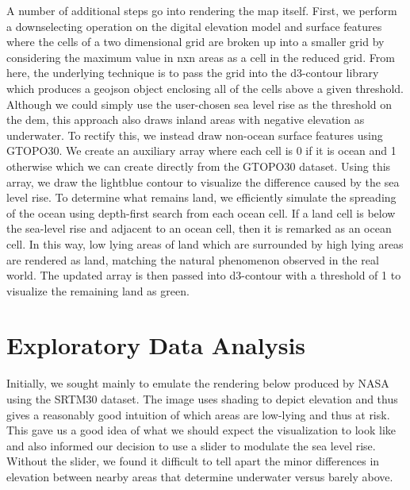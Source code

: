 \documentclass[12pt]{article}
\begin{document}
		A number of additional steps go into rendering the map itself.
		First, we perform a downselecting operation on the digital elevation model and surface features where the cells of a two dimensional grid are broken up into a smaller grid by considering the maximum value in nxn areas as a cell in the reduced grid.
		From here, the underlying technique is to pass the grid into the d3-contour library which produces a geojson object enclosing all of the cells above a given threshold.
		Although we could simply use the user-chosen sea level rise as the threshold on the dem, this approach also draws inland areas with negative elevation as underwater.
		To rectify this, we instead draw non-ocean surface features using GTOPO30.
		We create an auxiliary array where each cell is 0 if it is ocean and 1 otherwise which we can create directly from the GTOPO30 dataset.
		Using this array, we draw the lightblue contour to visualize the difference caused by the sea level rise.
		To determine what remains land, we efficiently simulate the spreading of the ocean using depth-first search from each ocean cell.
		If a land cell is below the sea-level rise and adjacent to an ocean cell, then it is remarked as an ocean cell.
		In this way, low lying areas of land which are surrounded by high lying areas are rendered as land, matching the natural phenomenon observed in the real world.
		The updated array is then passed into d3-contour with a threshold of 1 to visualize the remaining land as green.

	\section{Exploratory Data Analysis}
		Initially, we sought mainly to emulate the rendering below produced by NASA using the SRTM30 dataset.
		The image uses shading to depict elevation and thus gives a reasonably good intuition of which areas are low-lying and thus at risk.
		This gave us a good idea of what we should expect the visualization to look like and also informed our decision to use a slider to modulate the sea level rise.
		Without the slider, we found it difficult to tell apart the minor differences in elevation between nearby areas that determine underwater versus barely above.
		\newline
\end{document}
